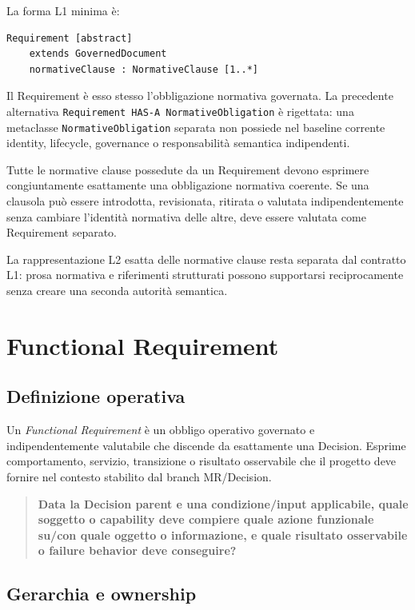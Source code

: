 \documentclass[12pt,a4paper,oneside]{report}
\newcommand{\fr}{\textit{Functional Requirement}}
\begin{document}
La forma L1 minima è:
\begin{lstlisting}
Requirement [abstract]
    extends GovernedDocument
    normativeClause : NormativeClause [1..*]
\end{lstlisting}

Il Requirement è esso stesso l'obbligazione normativa governata. La precedente alternativa \texttt{Requirement HAS-A NormativeObligation} è rigettata: una metaclasse \texttt{NormativeObligation} separata non possiede nel baseline corrente identity, lifecycle, governance o responsabilità semantica indipendenti.

\begin{resultnote}
Tutte le normative clause possedute da un Requirement devono esprimere congiuntamente esattamente una obbligazione normativa coerente. Se una clausola può essere introdotta, revisionata, ritirata o valutata indipendentemente senza cambiare l'identità normativa delle altre, deve essere valutata come Requirement separato.
\end{resultnote}

La rappresentazione L2 esatta delle normative clause resta separata dal contratto L1: prosa normativa e riferimenti strutturati possono supportarsi reciprocamente senza creare una seconda autorità semantica.

\section{Functional Requirement}

\subsection{Definizione operativa}

Un \fr{} è un obbligo operativo governato e indipendentemente valutabile che discende da esattamente una Decision. Esprime comportamento, servizio, transizione o risultato osservabile che il progetto deve fornire nel contesto stabilito dal branch MR/Decision.

\begin{quote}
\textbf{Data la Decision parent e una condizione/input applicabile, quale soggetto o capability deve compiere quale azione funzionale su/con quale oggetto o informazione, e quale risultato osservabile o failure behavior deve conseguire?}
\end{quote}

\subsection{Gerarchia e ownership}
\end{document}
